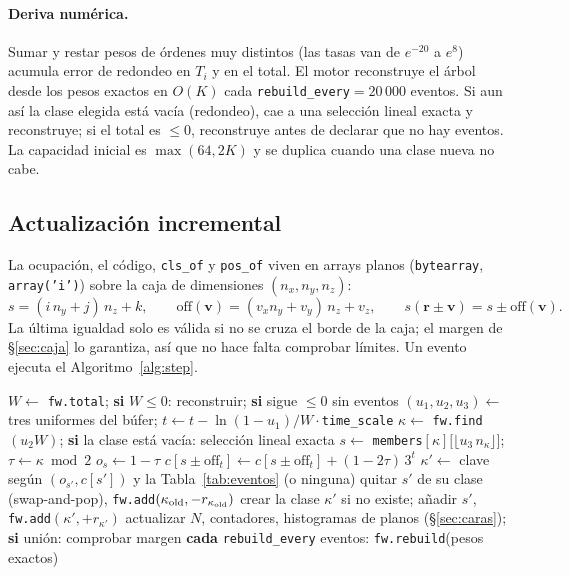 \documentclass[11pt,a4paper]{article}
\newcommand{\code}[1]{\texttt{#1}}
\newcommand{\vect}[1]{\mathbf{#1}}
\begin{document}
\paragraph{Deriva numérica.} Sumar y restar pesos de órdenes muy distintos (las tasas van de
$e^{-20}$ a $e^{8}$) acumula error de redondeo en $T_i$ y en el total. El motor reconstruye el árbol
desde los pesos exactos en $O(K)$ cada \code{rebuild\_every}$=20\,000$ eventos. Si aun así la clase
elegida está vacía (redondeo), cae a una selección lineal exacta y reconstruye; si el total es $\le0$,
reconstruye antes de declarar que no hay eventos. La capacidad inicial es $\max(64,2K)$ y se duplica
cuando una clase nueva no cabe.

\subsection{Actualización incremental}
\label{sec:incremental}

La ocupación, el código, \code{cls\_of} y \code{pos\_of} viven en arrays planos (\code{bytearray},
\code{array('i')}) sobre la caja de dimensiones $(n_x,n_y,n_z)$:
\begin{equation}
s=(i\,n_y+j)\,n_z+k,\qquad \mathrm{off}(\vect v)=(v_xn_y+v_y)\,n_z+v_z,\qquad s(\vect r\pm\vect v)=s\pm\mathrm{off}(\vect v).
\label{eq:plano}
\end{equation}
La última igualdad solo es válida si no se cruza el borde de la caja; el margen de \S\ref{sec:caja}
lo garantiza, así que no hace falta comprobar límites. Un evento ejecuta el Algoritmo~\ref{alg:step}.

\begin{algorithm}[t]
\caption{Un paso BKL (\code{KMC3D.step}, \code{flip}, \code{reclass}).}
\label{alg:step}
\begin{algorithmic}[1]
\small
\State $W\gets$ \code{fw.total}; \textbf{si} $W\le0$: reconstruir; \textbf{si} sigue $\le0$ \Return sin eventos
\State $(u_1,u_2,u_3)\gets$ tres uniformes del búfer; \quad $t\gets t-\ln(1-u_1)/W\cdot$\code{time\_scale}
\State $\kappa\gets$ \code{fw.find}$(u_2W)$; \textbf{si} la clase está vacía: selección lineal exacta
\State $s\gets$ \code{members}$[\kappa]\bigl[\lfloor u_3\,n_\kappa\rfloor\bigr]$; \quad $\tau\gets\kappa\bmod2$
\State $o_s\gets1-\tau$ 
  \State $c[s\pm\mathrm{off}_t]\gets c[s\pm\mathrm{off}_t]+(1-2\tau)\,3^t$
\EndFor
{} 
  \State $\kappa'\gets$ clave según $(o_{s'},c[s'])$ y la Tabla~\ref{tab:eventos} (o ninguna)
    \State quitar $s'$ de su clase (swap-and-pop), \code{fw.add}$(\kappa_{\rm old},-r_{\kappa_{\rm old}})$
    \State crear la clase $\kappa'$ si no existe; añadir $s'$, \code{fw.add}$(\kappa',+r_{\kappa'})$
  \EndIf
\EndFor
\State actualizar $N$, contadores, histogramas de planos (\S\ref{sec:caras}); \textbf{si} unión: comprobar margen
\State \textbf{cada} \code{rebuild\_every} eventos: \code{fw.rebuild}(pesos exactos)
\end{algorithmic}
\end{algorithm}
\end{document}
